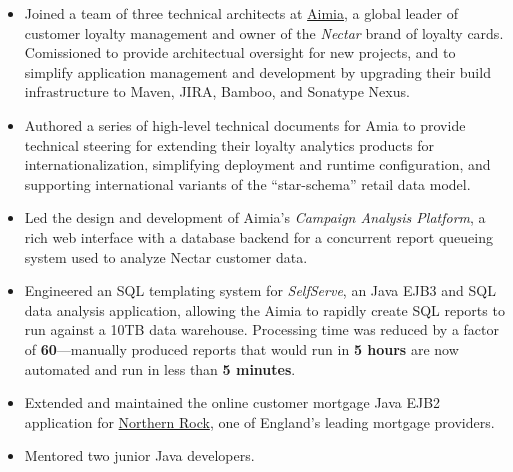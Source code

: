 \documentclass[a4paper,12pt]{article}
\newcommand{\clientwork}[2]{\emph{#1\hfill #2}\nopagebreak}
\begin{document}
\begin{itemize}

\item Joined a team of three technical architects at \href{http://www.aimia.com/}{Aimia}, a global leader of customer loyalty management and owner of the \emph{Nectar} brand of loyalty cards.  Comissioned to provide architectual oversight for new projects, and to simplify application management and development by upgrading their build infrastructure to Maven, JIRA, Bamboo, and Sonatype Nexus.

\item Authored a series of high-level technical documents for Amia to provide technical steering for extending their loyalty analytics products for internationalization, simplifying deployment and runtime configuration, and supporting international variants of the ``star-schema'' retail data model.  

\item Led the design and development of Aimia's \emph{Campaign Analysis Platform}, a rich web interface with a database backend for a concurrent report queueing system used to analyze Nectar customer data.

\item Engineered an SQL templating system for \emph{SelfServe}, an Java EJB3 and SQL data analysis application, allowing the Aimia to rapidly create SQL reports to run against a 10TB data warehouse.  Processing time was reduced by a factor of \textbf{60}---manually produced reports that would run in \textbf{5 hours} are now automated and run in less than \textbf{5 minutes}.

\end{itemize}


\begin{itemize}

\item Extended and maintained the online customer mortgage Java EJB2 application for \href{http://www.northernrock.co.uk}{Northern Rock}, one of England's leading mortgage providers.

\end{itemize}


\begin{itemize}

\item Mentored two junior Java developers.

\end{itemize}
\end{document}
